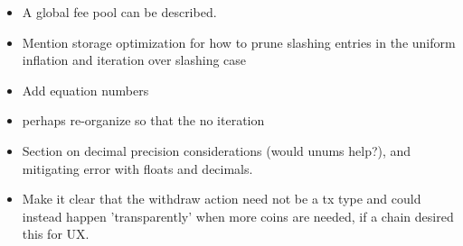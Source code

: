 \documentclass[]{article}
\begin{document}
\begin{itemize}
	\item A global fee pool can be described.
	\item Mention storage optimization for how to prune slashing entries in the uniform inflation and iteration over slashing case
	\item Add equation numbers
	\item perhaps re-organize so that the no iteration
	\item Section on decimal precision considerations (would unums help?), and mitigating error with floats and decimals.
	\item Make it clear that the withdraw action need not be a tx type and could instead happen 'transparently' when more coins are needed, if a chain desired this for UX.
\end{itemize}
\end{document}
